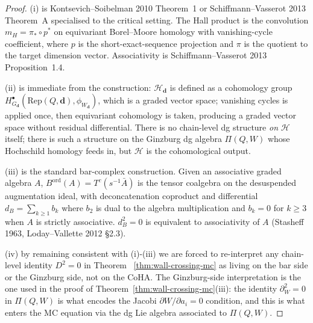 \begin{proof}
(i) is Kontsevich--Soibelman 2010 Theorem~1 or Schiffmann--Vasserot
2013 Theorem~A specialised to the critical setting. The Hall product
is the convolution $m_H = \pi_* \circ p^*$ on equivariant Borel--Moore
homology with vanishing-cycle coefficient, where $p$ is the
short-exact-sequence projection and $\pi$ is the quotient to the
target dimension vector. Associativity is Schiffmann--Vasserot 2013
Proposition~1.4.

(ii) is immediate from the construction: $\mathcal{H}_\mathbf{d}$
is defined as a cohomology group
$H^\bullet_{G_\mathbf{d}}(\mathrm{Rep}(Q, \mathbf{d}), \phi_{W_\mathbf{d}})$,
which is a graded vector space; vanishing cycles is applied once, then
equivariant cohomology is taken, producing a graded vector space
without residual differential. There is no chain-level dg structure
\emph{on} $\mathcal{H}$ itself; there is such a structure on the
Ginzburg dg algebra $\Pi(Q, W)$ whose Hochschild homology feeds in,
but $\mathcal{H}$ is the cohomological output.

(iii) is the standard bar-complex construction. Given an associative
graded algebra $A$, $B^{\mathrm{ord}}(A) = T^c(s^{-1} \bar A)$ is the
tensor coalgebra on the desuspended augmentation ideal, with
deconcatenation coproduct and differential $d_B = \sum_{k \geq 1} b_k$
where $b_2$ is dual to the algebra multiplication and $b_k = 0$ for
$k \geq 3$ when $A$ is strictly associative. $d_B^2 = 0$ is equivalent
to associativity of $A$ (Stasheff 1963, Loday--Vallette 2012 \S2.3).

(iv) by remaining consistent with (i)-(iii) we are forced to
re-interpret any chain-level identity $D^2 = 0$ in Theorem~%
\ref{thm:wall-crossing-mc} as living on the bar side or the Ginzburg
side, not on the CoHA. The Ginzburg-side interpretation is the one used
in the proof of Theorem~\ref{thm:wall-crossing-mc}(iii): the identity
$\partial_W^2 = 0$ in $\Pi(Q, W)$ is what encodes the Jacobi
$\partial W / \partial a_i = 0$ condition, and this is what enters the
MC equation via the dg Lie algebra associated to $\Pi(Q, W)$.
\end{proof}

